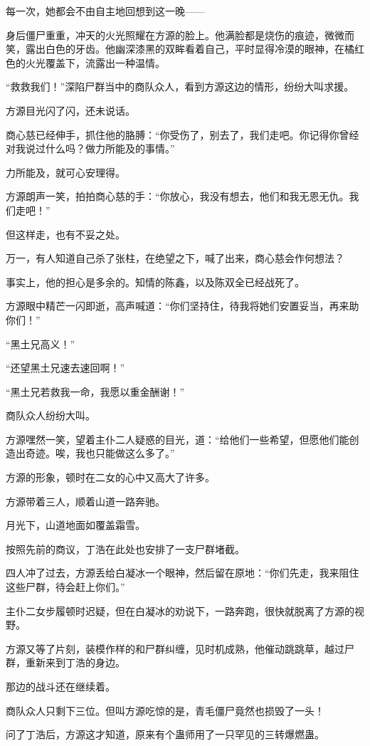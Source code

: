 \begin{this_body}
每一次，她都会不由自主地回想到这一晚——

身后僵尸重重，冲天的火光照耀在方源的脸上。他满脸都是烧伤的痕迹，微微而笑，露出白色的牙齿。他幽深漆黑的双眸看着自己，平时显得冷漠的眼神，在橘红色的火光覆盖下，流露出一种温情。

“救救我们！”深陷尸群当中的商队众人，看到方源这边的情形，纷纷大叫求援。

方源目光闪了闪，还未说话。

商心慈已经伸手，抓住他的胳膊：“你受伤了，别去了，我们走吧。你记得你曾经对我说过什么吗？做力所能及的事情。”

力所能及，就可心安理得。

方源朗声一笑，拍拍商心慈的手：“你放心，我没有想去，他们和我无恩无仇。我们走吧！”

但这样走，也有不妥之处。

万一，有人知道自己杀了张柱，在绝望之下，喊了出来，商心慈会作何想法？

事实上，他的担心是多余的。知情的陈鑫，以及陈双全已经战死了。

方源眼中精芒一闪即逝，高声喊道：“你们坚持住，待我将她们安置妥当，再来助你们！”

“黑土兄高义！”

“还望黑土兄速去速回啊！”

“黑土兄若救我一命，我愿以重金酬谢！”

商队众人纷纷大叫。

方源嘿然一笑，望着主仆二人疑惑的目光，道：“给他们一些希望，但愿他们能创造出奇迹。唉，我也只能做这么多了。”

方源的形象，顿时在二女的心中又高大了许多。

方源带着三人，顺着山道一路奔驰。

月光下，山道地面如覆盖霜雪。

按照先前的商议，丁浩在此处也安排了一支尸群堵截。

四人冲了过去，方源丢给白凝冰一个眼神，然后留在原地：“你们先走，我来阻住这些尸群，待会赶上你们。”

主仆二女步履顿时迟疑，但在白凝冰的劝说下，一路奔跑，很快就脱离了方源的视野。

方源又等了片刻，装模作样的和尸群纠缠，见时机成熟，他催动跳跳草，越过尸群，重新来到丁浩的身边。

那边的战斗还在继续着。

商队众人只剩下三位。但叫方源吃惊的是，青毛僵尸竟然也损毁了一头！

问了丁浩后，方源这才知道，原来有个蛊师用了一只罕见的三转爆燃蛊。


\end{this_body}
